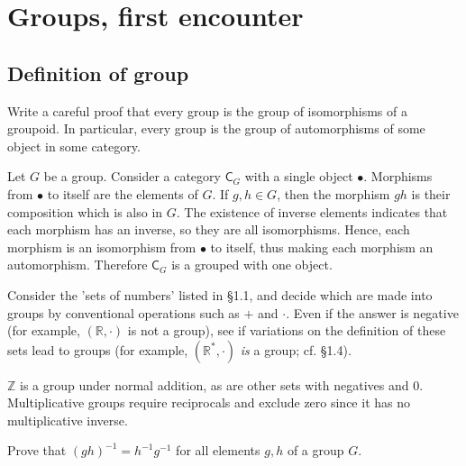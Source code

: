 \documentclass[../master.tex]{subfiles}
\begin{document}
  \chapter{Groups, first encounter}

  \section{Definition of group}

  \begin{problem}
    Write a careful proof that every group is the group of isomorphisms of a groupoid.
    In particular, every group is the group of automorphisms of some object in some category.
  \end{problem}

  \begin{solution}
    Let \(G\) be a group.
    Consider a category \(\mathsf{C}_{G}\) with a single object \(\bullet\).
    Morphisms from \(\bullet\) to itself are the elements of \(G\).
    If \(g, h \in G\), then the morphism \(gh\) is their composition which is also in \(G\).
    The existence of inverse elements indicates that each morphism has an inverse, so they are all isomorphisms.
    Hence, each morphism is an isomorphism from \(\bullet\) to itself, thus making each morphism an automorphism.
    Therefore \(\mathsf{C}_{G}\) is a grouped with one object.
  \end{solution}

  \begin{problem}
     Consider the 'sets of numbers' listed in \S 1.1, and decide which are made
     into groups by conventional operations such as $+$ and $\cdot$. Even if the
     answer is negative (for example, $(\mathbb{R}, \cdot)$ is not a group), see
     if variations on the definition of these sets lead to groups (for example,
     $(\mathbb{R}^{*}, \cdot)$ \textit{is} a group; cf. \S 1.4).
  \end{problem}

  \begin{solution}
      $\mathbb{Z}$ is a group under normal addition, as are other sets with
      negatives and 0. Multiplicative groups require reciprocals and exclude
      zero since it has no multiplicative inverse. 
  \end{solution}

  \begin{problem}
      Prove that $(gh)^{-1} = h^{-1} g^{-1}$ for all elements $g, h$ of a group
      $G$.
  \end{problem}
\end{document}
